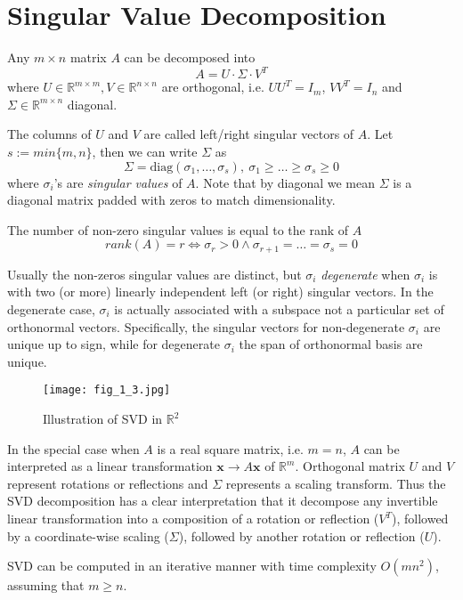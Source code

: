\documentclass[../book-template.tex]{subfiles}
\begin{document}
\section{Singular Value Decomposition}
Any $m\times n$ matrix $A$ can be decomposed into
\begin{equation*}
    A=U\cdot \Sigma \cdot V^T
\end{equation*}
where $U\in \mathbb{R}^{m\times m},V\in \mathbb{R}^{n\times n}$ are orthogonal, i.e. $UU^T=I_m$, $VV^T=I_n$ and $\Sigma\in \mathbb{R}^{m\times n}$ diagonal. 
\par The columns of $U$ and $V$ are called left/right singular vectors of $A$. Let $s:=min\{m,n\}$, then we can write $\Sigma$ as $$\Sigma = \text{diag}(\sigma_1,\dots,\sigma_s),\ \sigma_1\geq\dots\geq\sigma_s\geq0$$
where $\sigma_i$'s are \emph{singular values} of $A$. Note that by diagonal we mean $\Sigma$ is a diagonal matrix padded with zeros to match dimensionality. 
\par The number of non-zero singular values is equal to the rank of $A$
\begin{equation*}
    rank(A)=r\Longleftrightarrow\sigma_r>0\wedge \sigma_{r+1}=\dots=\sigma_{s}=0
\end{equation*}
\par Usually the non-zeros singular values are distinct, but $\sigma_i$ \emph{degenerate} when $\sigma_i$ is with two (or more) linearly independent left (or right) singular vectors. In the degenerate case, $\sigma_i$ is actually associated with a subspace not a particular set of orthonormal vectors. Specifically, the singular vectors for non-degenerate $\sigma_i$ are unique up to sign, while for degenerate $\sigma_i$ the span of orthonormal basis are unique.
\begin{figure}[h] 
    \centering 
    \texttt{[image: fig\_1\_3.jpg]} 
    \caption{Illustration of SVD in $\mathbb{R}^2$}\label{fig_1_3}
\end{figure}
\par In the special case when $A$ is a real square matrix, i.e. $m=n$, $A$ can be interpreted as a linear transformation $\bm{x}\rightarrow A\bm{x}$ of $\mathbb{R}^m$. Orthogonal matrix $U$ and $V$ represent rotations or reflections and $\Sigma$ represents a scaling transform. Thus the SVD decomposition has a clear interpretation that it decompose any invertible linear transformation into a composition of a rotation or reflection ($V^T$), followed by a coordinate-wise scaling ($\Sigma$), followed by another rotation or reflection ($U$).
\begin{remark}
SVD can be computed in an iterative manner with time complexity $O(mn^2)$, assuming that $m\geq n$.
\end{remark}
\end{document}
